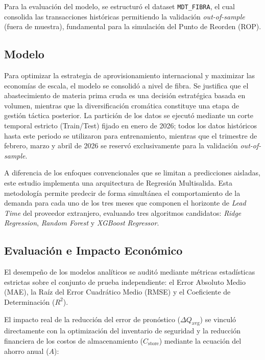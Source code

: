 \documentclass[conference,twoside]{IEEEtran}
\begin{document}
Para la evaluación del modelo, se estructuró el dataset \texttt{MDT\_FIBRA}, el cual consolida las transacciones históricas permitiendo la validación \textit{out-of-sample} (fuera de muestra), fundamental para la simulación del Punto de Reorden (ROP).

\subsection{Modelo}
\label{subsec:modelo}

Para optimizar la estrategia de aprovisionamiento internacional y maximizar las economías de escala, el modelo se consolidó a nivel de fibra. Se justifica que el abastecimiento de materia prima cruda es una decisión estratégica basada en volumen, mientras que la diversificación cromática constituye una etapa de gestión táctica posterior. La partición de los datos se ejecutó mediante un corte temporal estricto (Train/Test) fijado en enero de 2026; todos los datos históricos hasta este periodo se utilizaron para entrenamiento, mientras que el trimestre de febrero, marzo y abril de 2026 se reservó exclusivamente para la validación \textit{out-of-sample}.

A diferencia de los enfoques convencionales que se limitan a predicciones aisladas, este estudio implementa una arquitectura de Regresión Multisalida. Esta metodología permite predecir de forma simultánea el comportamiento de la demanda para cada uno de los tres meses que componen el horizonte de \textit{Lead Time} del proveedor extranjero, evaluando tres algoritmos candidatos: \textit{Ridge Regression}, \textit{Random Forest} y \textit{XGBoost Regressor}.

\subsection{Evaluación e Impacto Económico}
\label{subsec:evaluacion}

El desempeño de los modelos analíticos se auditó mediante métricas estadísticas estrictas sobre el conjunto de prueba independiente: el Error Absoluto Medio (MAE), la Raíz del Error Cuadrático Medio (RMSE) y el Coeficiente de Determinación ($R^2$). 

El impacto real de la reducción del error de pronóstico ($\Delta Q_{\text{avg}}$) se vinculó directamente con la optimización del inventario de seguridad y la reducción financiera de los costos de almacenamiento ($C_{\text{store}}$) mediante la ecuación del ahorro anual ($A$):
\end{document}
